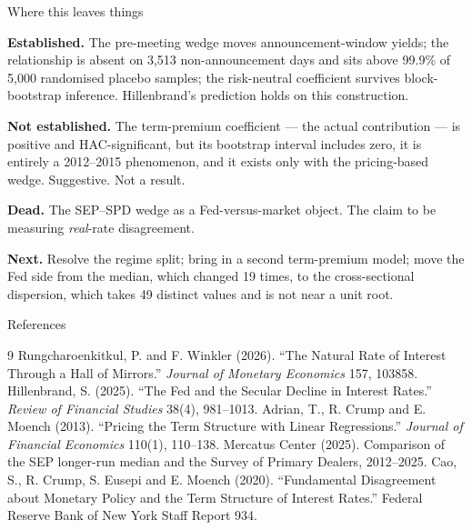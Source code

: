 \documentclass[aspectratio=169, 11pt]{beamer}
\begin{document}
\begin{frame}{Where this leaves things}

\textbf{Established.} The pre-meeting wedge moves announcement-window yields;
the relationship is absent on 3,513 non-announcement days and sits above
99.9\% of 5,000 randomised placebo samples; the risk-neutral coefficient
survives block-bootstrap inference. Hillenbrand's prediction holds on this
construction.

\vspace{0.6em}

\textbf{Not established.} The term-premium coefficient --- the actual
contribution --- is positive and HAC-significant, but its bootstrap interval
includes zero, it is entirely a 2012--2015 phenomenon, and it exists only
with the pricing-based wedge. Suggestive. Not a result.

\vspace{0.6em}

\textbf{Dead.} The SEP--SPD wedge as a Fed-versus-market object. The claim to
be measuring \emph{real}-rate disagreement.

\vspace{0.6em}

\textbf{Next.} Resolve the regime split; bring in a second term-premium model;
move the Fed side from the median, which changed 19 times, to the
cross-sectional dispersion, which takes 49 distinct values and is not near a
unit root.

\end{frame}

\begin{frame}{References}
\footnotesize
\begin{thebibliography}{9}
 Rungcharoenkitkul, P. and F. Winkler (2026). ``The Natural Rate
of Interest Through a Hall of Mirrors.'' \emph{Journal of Monetary
Economics} 157, 103858.
 Hillenbrand, S. (2025). ``The Fed and the Secular Decline in
Interest Rates.'' \emph{Review of Financial Studies} 38(4), 981--1013.
 Adrian, T., R. Crump and E. Moench (2013). ``Pricing the Term
Structure with Linear Regressions.'' \emph{Journal of Financial Economics}
110(1), 110--138.
 Mercatus Center (2025). Comparison of the SEP longer-run
median and the Survey of Primary Dealers, 2012--2025.
 Cao, S., R. Crump, S. Eusepi and E. Moench (2020).
``Fundamental Disagreement about Monetary Policy and the Term Structure of
Interest Rates.'' Federal Reserve Bank of New York Staff Report 934.
\end{thebibliography}
\end{frame}
\end{document}
